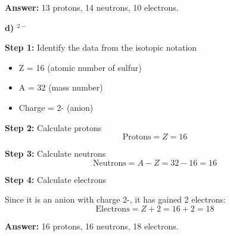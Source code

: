 \begin{exercise}
\begin{solu}
        \textbf{Answer:} 13 protons, 14 neutrons, 10 electrons.

        \textbf{d) $^{2-}$}

        \textbf{Step 1:} Identify the data from the isotopic notation
        \begin{itemize}
            \item Z = 16 (atomic number of sulfur)
            \item A = 32 (mass number)
            \item Charge = 2- (anion)
        \end{itemize}

        \textbf{Step 2:} Calculate protons
        \[
            \text{Protons} = Z = 16
        \]

        \textbf{Step 3:} Calculate neutrons
        \[
            \text{Neutrons} = A - Z = 32 - 16 = 16
        \]

        \textbf{Step 4:} Calculate electrons

        Since it is an anion with charge 2-, it has gained 2 electrons:
        \[
            \text{Electrons} = Z + 2 = 16 + 2 = 18
        \]

        \textbf{Answer:} 16 protons, 16 neutrons, 18 electrons.
    \end{solu}
\end{exercise}
